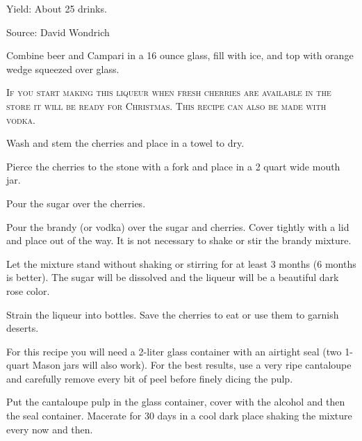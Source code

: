 \documentclass[letterpaper]{recipePMG}
\begin{document}
Yield: About 25 drinks.

Source: David Wondrich




Combine beer and Campari in a 16 ounce glass, fill with ice, and top with orange wedge squeezed over glass.

\newpage
{}
\label{CherryLiqueur}


\textsc{If you start making this liqueur when fresh cherries are
available in the store it will be ready for Christmas.  This
recipe can also be made with vodka.}

Wash and stem the cherries and place in a towel to dry.

Pierce the cherries to the stone with a fork and place in a 2
quart wide mouth jar.

Pour the sugar over the cherries.

Pour the brandy (or vodka) over the sugar and cherries.  Cover
tightly with a lid and place out of the way.  It is not necessary
to shake or stir the brandy mixture.

Let the mixture stand without shaking or stirring for at least
3 months (6 months is better).  The sugar will be dissolved and
the liqueur will be a beautiful dark rose color.

Strain the liqueur into  bottles. Save the cherries to eat or use them
to garnish deserts.

\newpage

\label{CantaloupeLiqueur}


For this recipe you will need a 2-liter glass container with an airtight seal (two 1-quart Mason jars will also work). For the best results, use a very ripe cantaloupe and carefully remove every bit of peel before finely dicing the pulp.

Put the cantaloupe pulp in the glass container, cover with the alcohol and then the seal container. Macerate for 30 days in a cool dark place shaking the mixture every now and then.
\end{document}
